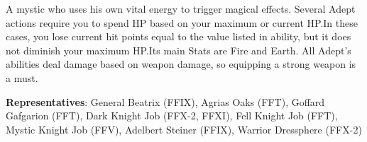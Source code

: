 \begin{jobdesc}[name=pjob-adept]
    A mystic who uses his own vital energy to trigger magical effects. Several Adept actions require you to spend HP based on your maximum or current HP.\@{}In these cases, you lose current hit points equal to the value listed in ability, but it does not diminish your maximum HP.\@{}Its main Stats are Fire and Earth. All Adept’s abilities deal damage based on weapon damage, so equipping a strong weapon is a must. \pc%

    \textbf{Representatives}: General Beatrix (FFIX), Agrias Oaks (FFT), Goffard Gafgarion (FFT), Dark Knight Job (FFX-2, FFXI), Fell Knight Job (FFT), Mystic Knight Job (FFV), Adelbert Steiner (FFIX), Warrior Dressphere (FFX-2) \pc%

    \jobstats[hpa=4x,hpb=5x,hpc=6x,hpd=7x,mpa=1x,mpb=2x,mpc=3x,armor=Heavy,weapons=Claws/Gloves \\ Weapons \& Shield \\ Heavy Weapons \\ Katanas \\  Wands \\ Staves ]
\end{jobdesc}

